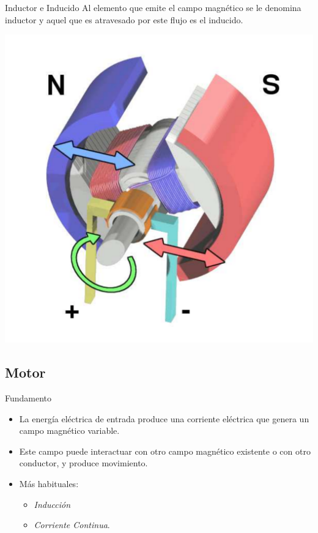 \documentclass[xcolor={usenames,svgnames,dvipsnames}]{beamer}
\begin{document}
\begin{frame}[label={sec:org07f1155}]{Inductor e Inducido}
Al elemento que emite el campo magnético se le denomina \alert{inductor} y aquel que es atravesado por este flujo es el \alert{inducido}.
\begin{center}
\includegraphics[height=0.5\textheight]{../figs/Electric_motor_cycle_3.pdf}
\end{center}
\end{frame}

\subsection{Motor}
\label{sec:orgec713bc}
\begin{frame}[label={sec:orgce0f466}]{Fundamento}
\begin{itemize}
\item La energía eléctrica de \alert{entrada} produce una \alert{corriente eléctrica} que genera un \alert{campo magnético variable}.
\item Este campo puede \alert{interactuar} con otro \alert{campo magnético existente} o con \alert{otro conductor}, y produce movimiento.
\item Más habituales:
\begin{itemize}
\item \emph{Inducción}
\item \emph{Corriente Continua}.
\end{itemize}
\end{itemize}
\end{frame}
\end{document}
